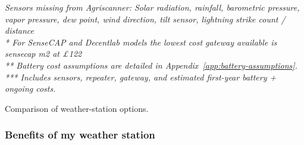 \begin{table}[H]
  \vspace{0.25em}
  \textit{\footnotesize * Sensors missing from Agriscanner: Solar radiation,
    rainfall, barometric pressure, vapor pressure, dew point, wind direction,
    tilt sensor, lightning strike count / distance} \\
  \textit{\footnotesize ** For SenseCAP and Decentlab models the lowest cost
    gateway available is sensecap m2 at £122} \\
  \textit{\footnotesize *** Battery cost assumptions are detailed in
    Appendix~\ref{app:battery-assumptions}.} \\
  \textit{\footnotesize **** Includes sensors, repeater, gateway, and estimated first-year battery + ongoing costs.}
  \caption{Comparison of weather-station options.}
  \label{tab:commercial-comparison}
\end{table}

\subsubsection{Benefits of my weather station}

